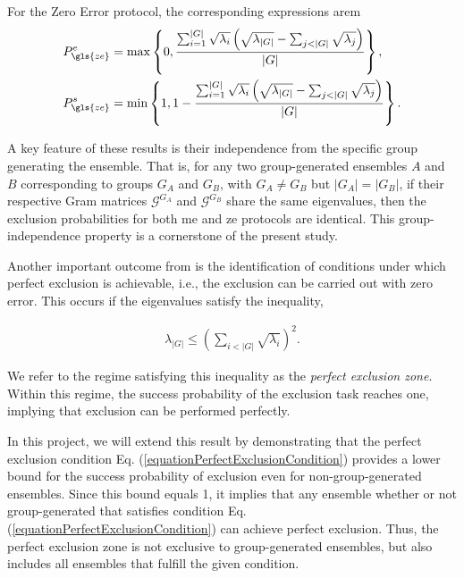 \documentclass[12pt,letterpaper]{article}
\begin{document}
For the Zero Error protocol, the corresponding expressions arem
\begin{align*}
	P_{\gls{ze}}^e &= \max\left\{ 0, \frac{ \sum_{i=1}^{|G|} \sqrt{\lambda_i} \left( \sqrt{\lambda_{|G|}} - \sum_{j<|G|} \sqrt{\lambda_j} \right) }{|G|} \right\}, \\
	P_{\gls{ze}}^s &= \min\left\{ 1, 1 - \frac{ \sum_{i=1}^{|G|} \sqrt{\lambda_i} \left( \sqrt{\lambda_{|G|}} - \sum_{j<|G|} \sqrt{\lambda_j} \right) }{|G|} \right\}.
\end{align*}

A key feature of these results is their independence from the specific group generating the ensemble. That is, for any two group-generated ensembles $A$ and $B$ corresponding to groups $G_A$ and $G_B$, with $G_A \neq G_B$ but $|G_A| = |G_B|$, if their respective Gram matrices $\mathcal{G}^{G_A}$ and $\mathcal{G}^{G_B}$ share the same eigenvalues, then the exclusion probabilities for both \gls{me} and \gls{ze} protocols are identical. This group-independence property is a cornerstone of the present study.

Another important outcome from \cite{MainPaper} is the identification of conditions under which perfect exclusion is achievable, i.e., the exclusion can be carried out with zero error. This occurs if the eigenvalues satisfy the inequality,

\begin{align}\label{equationPerfectExclusionCondition}
	\lambda_{|G|} \leq \left( \sum_{i<|G|} \sqrt{\lambda_i} \right)^2.
\end{align}

We refer to the regime satisfying this inequality as the \emph{perfect exclusion zone}. Within this regime, the success probability of the exclusion task reaches one, implying that exclusion can be performed perfectly.

In this project, we will extend this result by demonstrating that the perfect exclusion condition Eq. (\ref{equationPerfectExclusionCondition}) provides a lower bound for the success probability of exclusion even for non-group-generated ensembles. Since this bound equals 1, it implies that any ensemble whether or not group-generated that satisfies condition Eq. (\ref{equationPerfectExclusionCondition}) can achieve perfect exclusion. Thus, the perfect exclusion zone is not exclusive to group-generated ensembles, but also includes all ensembles that fulfill the given condition.
\end{document}
